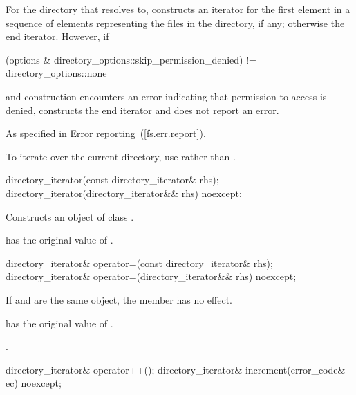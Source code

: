 \begin{itemdescr}
\pnum
\effects For the directory that  resolves to, constructs an
iterator for the first element in a sequence of 
elements representing the files in the directory, if any; otherwise the end
iterator. However, if
\begin{codeblock}
(options & directory_options::skip_permission_denied) != directory_options::none
\end{codeblock}
and construction encounters an error indicating
that permission to access  is denied, constructs the end iterator
and does not report an error.

\pnum
\throws As specified in Error reporting~(\ref{fs.err.report}).

\pnum
\begin{note} To iterate over the current directory, use  rather than . \end{note}
\end{itemdescr}

%
\begin{itemdecl}
directory_iterator(const directory_iterator& rhs);
directory_iterator(directory_iterator&& rhs) noexcept;
\end{itemdecl}

\begin{itemdescr}
\pnum
\effects Constructs an object of class .

\pnum
\postconditions {} has the original value of .
\end{itemdescr}

%
\begin{itemdecl}
directory_iterator& operator=(const directory_iterator& rhs);
directory_iterator& operator=(directory_iterator&& rhs) noexcept;
\end{itemdecl}

\begin{itemdescr}
\pnum
\effects If  and  are the same
  object, the member has no effect.

\pnum
\postconditions {} has the original value of .

\pnum
\returns {}.
\end{itemdescr}

%
%
\begin{itemdecl}
directory_iterator& operator++();
directory_iterator& increment(error_code& ec) noexcept;
\end{itemdecl}

